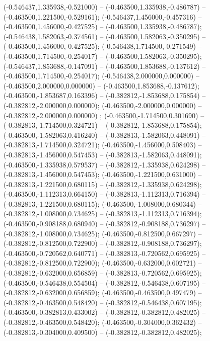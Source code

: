  (-0.546437,1.335938,-0.521000) -- (-0.463500,1.335938,-0.486787) -- (-0.463500,1.221500,-0.529161);
 (-0.546437,1.456000,-0.457316) -- (-0.463500,1.456000,-0.427525) -- (-0.463500,1.335938,-0.486787);
 (-0.546438,1.582063,-0.374561) -- (-0.463500,1.582063,-0.350295) -- (-0.463500,1.456000,-0.427525);
 (-0.546438,1.714500,-0.271549) -- (-0.463500,1.714500,-0.254017) -- (-0.463500,1.582063,-0.350295);
 (-0.546437,1.853688,-0.147091) -- (-0.463500,1.853688,-0.137612) -- (-0.463500,1.714500,-0.254017);
 (-0.546438,2.000000,0.000000) -- (-0.463500,2.000000,0.000000) -- (-0.463500,1.853688,-0.137612);
 (-0.463500,-1.853687,0.163396) -- (-0.382812,-1.853688,0.175854) -- (-0.382812,-2.000000,0.000000);
 (-0.463500,-2.000000,0.000000) -- (-0.382812,-2.000000,0.000000) ;
 (-0.463500,-1.714500,0.301690) -- (-0.382813,-1.714500,0.324721) -- (-0.382812,-1.853688,0.175854);
 (-0.463500,-1.582063,0.416240) -- (-0.382813,-1.582063,0.448091) -- (-0.382813,-1.714500,0.324721);
 (-0.463500,-1.456000,0.508403) -- (-0.382813,-1.456000,0.547453) -- (-0.382813,-1.582063,0.448091);
 (-0.463500,-1.335938,0.579537) -- (-0.382812,-1.335938,0.624298) -- (-0.382813,-1.456000,0.547453);
 (-0.463500,-1.221500,0.631000) -- (-0.382813,-1.221500,0.680115) -- (-0.382812,-1.335938,0.624298);
 (-0.463500,-1.112313,0.664150) -- (-0.382813,-1.112313,0.716394) -- (-0.382813,-1.221500,0.680115);
 (-0.463500,-1.008000,0.680344) -- (-0.382812,-1.008000,0.734625) -- (-0.382813,-1.112313,0.716394);
 (-0.463500,-0.908188,0.680940) -- (-0.382812,-0.908188,0.736297) -- (-0.382812,-1.008000,0.734625);
 (-0.463500,-0.812500,0.667297) -- (-0.382812,-0.812500,0.722900) -- (-0.382812,-0.908188,0.736297);
 (-0.463500,-0.720562,0.640771) -- (-0.382813,-0.720562,0.695925) -- (-0.382812,-0.812500,0.722900);
 (-0.463500,-0.632000,0.602721) -- (-0.382812,-0.632000,0.656859) -- (-0.382813,-0.720562,0.695925);
 (-0.463500,-0.546438,0.554504) -- (-0.382812,-0.546438,0.607195) -- (-0.382812,-0.632000,0.656859);
 (-0.463500,-0.463500,0.497479) -- (-0.382812,-0.463500,0.548420) -- (-0.382812,-0.546438,0.607195);
 (-0.463500,-0.382813,0.433002) -- (-0.382812,-0.382812,0.482025) -- (-0.382812,-0.463500,0.548420);
 (-0.463500,-0.304000,0.362432) -- (-0.382813,-0.304000,0.409500) -- (-0.382812,-0.382812,0.482025);
